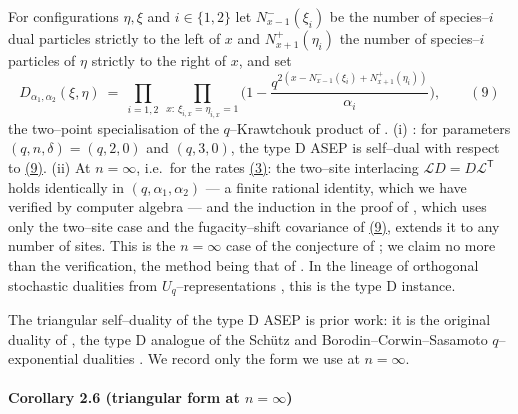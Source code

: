 \documentclass[11pt]{article}
\theoremstyle{plain}
\theoremstyle{definition}
\theoremstyle{remark}
\newcommand{\cL}{\mathcal L}\newcommand{\cO}{\mathcal O}\newcommand{\cE}{\mathcal E}
\begin{document}
For configurations $\eta,\xi$ and $i\in\{1,2\}$ let $N^-_{x-1}(\xi_i)$ be the number
of species--$i$ dual particles strictly to the left of $x$ and $N^+_{x+1}(\eta_i)$
the number of species--$i$ particles of $\eta$ strictly to the right of $x$, and set
\label{eq_Dreu}
\begin{equation}
  D_{\alpha_1,\alpha_2}(\xi,\eta)\ =\ \prod_{i=1,2}\ \prod_{x:\,\xi_{i,x}=\eta_{i,x}=1}
  \Big(1-\frac{q^{2\left(x-N^-_{x-1}(\xi_i)+N^+_{x+1}(\eta_i)\right)}}{\alpha_i}\Big),\qquad(9)
\end{equation}
the two--point specialisation of the $q$--Krawtchouk product of
\cite[Thm.~3.1]{REU}.
\textup{(i)} \cite[Thm.~3.1]{REU}: for parameters $(q,n,\delta)=(q,2,0)$ and
$(q,3,0)$, the type D ASEP is self--dual with respect to \hyperref[eq_Dreu]{(9)}.
\textup{(ii)} At $n=\infty$, i.e.\ for the rates \hyperref[eq_rates]{(3)}: the two--site
interlacing $\cL D=D\cL^{\mathsf T}$ holds identically in $(q,\alpha_1,\alpha_2)$ ---
a finite rational identity, which we have verified by computer algebra --- and the
induction in the proof of \cite[Thm.~3.1, eqs.~(16)--(19)]{REU}, which uses only the
two--site case and the fugacity--shift covariance of \hyperref[eq_Dreu]{(9)}, extends it to
any number of sites. This is the $n=\infty$ case of the conjecture of
\cite[Rmk.~4]{REU}; we claim no more than the verification, the method being that of
\cite{REU}. In the lineage of orthogonal stochastic dualities from
$U_q$--representations \cite{Groenevelt,CGRS}, this is the type D instance.
\par

The triangular self--duality of the type D ASEP is prior work: it is the original
duality of \cite{KLLPZ}, the type D analogue of the Sch\"utz and
Borodin--Corwin--Sasamoto $q$--exponential dualities \cite{SchutzDual,BCS}. We record
only the form we use at $n=\infty$.

\paragraph{Corollary 2.6 (triangular form at $n=\infty$)}\label{cor_tri}
\end{document}
